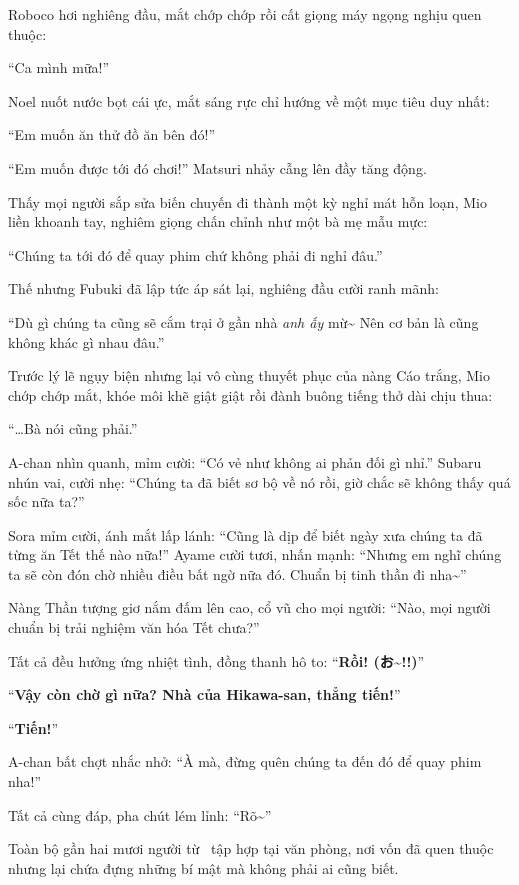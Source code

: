 \documentclass[../main.tex]{subfiles}
\begin{document}
Roboco hơi nghiêng đầu, mắt chớp chớp rồi cất giọng máy ngọng nghịu quen thuộc:

``Ca mình mữa!''

Noel nuốt nước bọt cái ực, mắt sáng rực chỉ hướng về một mục tiêu duy nhất:

``Em muốn ăn thử đồ ăn bên đó!''

``Em muốn được tới đó chơi!'' Matsuri nhảy cẫng lên đầy tăng động.

Thấy mọi người sắp sửa biến chuyến đi thành một kỳ nghỉ mát hỗn loạn, Mio liền khoanh tay, nghiêm giọng chấn chỉnh như một bà mẹ mẫu mực:

``Chúng ta tới đó để quay phim chứ không phải đi nghỉ đâu.''

Thế nhưng Fubuki đã lập tức áp sát lại, nghiêng đầu cười ranh mãnh:

``Dù gì chúng ta cũng sẽ cắm trại ở gần nhà \emph{anh ấy} mừ\~{} Nên cơ bản là cũng không khác gì nhau đâu.''

Trước lý lẽ ngụy biện nhưng lại vô cùng thuyết phục của nàng Cáo trắng, Mio chớp chớp mắt, khóe môi khẽ giật giật rồi đành buông tiếng thở dài chịu thua:

``\dots Bà nói cũng phải.''

A-chan nhìn quanh, mỉm cười: ``Có vẻ như không ai phản đối gì nhỉ.'' Subaru nhún vai, cười nhẹ: ``Chúng ta đã biết sơ bộ về nó rồi, giờ chắc sẽ không thấy quá sốc nữa ta?''

Sora mỉm cười, ánh mắt lấp lánh: ``Cũng là dịp để biết ngày xưa chúng ta đã từng ăn Tết thế nào nữa!'' Ayame cười tươi, nhấn mạnh: ``Nhưng em nghĩ chúng ta sẽ còn đón chờ nhiều điều bất ngờ nữa đó. Chuẩn bị tinh thần đi nha\~{}''

Nàng Thần tượng giơ nắm đấm lên cao, cổ vũ cho mọi người: ``Nào, mọi người chuẩn bị trải nghiệm văn hóa Tết chưa?''

Tất cả đều hưởng ứng nhiệt tình, đồng thanh hô to: ``\textbf{Rồi! (お\~{}!!)}''

``\textbf{Vậy còn chờ gì nữa? Nhà của Hikawa-san, thẳng tiến!}''

``\textbf{Tiến!}''

A-chan bất chợt nhắc nhở: ``À mà, đừng quên chúng ta đến đó để quay phim nha!''

Tất cả cùng đáp, pha chút lém lỉnh: ``Rõ\~{}''

Toàn bộ gần hai mươi người từ \hll\ tập hợp tại văn phòng, nơi vốn đã quen thuộc nhưng lại chứa đựng những bí mật mà không phải ai cũng biết.
\end{document}
